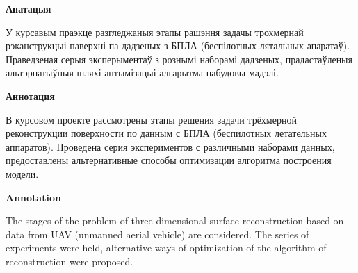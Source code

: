 \begin{center}
    {\bf Анатацыя}
\end{center}

У курсавым праэкце разгледжаныя этапы рашэння задачы трохмернай рэканструкцыі паверхні па дадзеных з БПЛА (беспілотных лятальных апаратаў). Праведзеная серыя эксперыментаў з рознымі наборамі дадзеных, прадастаўленыя альтэрнатыўныя шляхі аптымізацыі алгарытма пабудовы мадэлі.

\begin{center}
    {\bf Аннотация}
\end{center}

В курсовом проекте рассмотрены этапы решения задачи трёхмерной реконструкции поверхности по данным с БПЛА (беспилотных летательных аппаратов). Проведена серия экспериментов с различными наборами данных, предоставлены альтернативные способы оптимизации алгоритма построения модели.

\begin{center}
    {\bf Annotation}
\end{center}

The stages of the problem of three-dimensional surface reconstruction based on data from UAV (unmanned aerial vehicle) are considered. The series of experiments were held, alternative ways of optimization of the algorithm of reconstruction were proposed.

\newpage